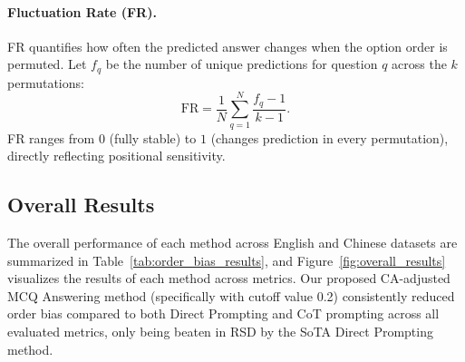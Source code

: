 \paragraph{Fluctuation Rate (FR).}
FR quantifies how often the predicted answer changes when the option order is permuted.  
Let $f_q$ be the number of unique predictions for question $q$ across the $k$ permutations:
\begin{equation}
  \mathrm{FR}=
  \frac{1}{N}\sum_{q=1}^{N}\frac{f_q-1}{k-1}.
  \label{eq:fr}
\end{equation}
FR ranges from $0$ (fully stable) to $1$ (changes prediction in every permutation), directly reflecting positional sensitivity.

\subsection{Overall Results}

The overall performance of each method across English and Chinese datasets are summarized in Table~\ref{tab:order_bias_results}, and Figure~\ref{fig:overall_results} visualizes the results of each method across metrics. Our proposed CA-adjusted MCQ Answering method (specifically with cutoff value 0.2) consistently reduced order bias compared to both Direct Prompting and CoT prompting across all evaluated metrics, only being beaten in RSD by the SoTA Direct Prompting method.

